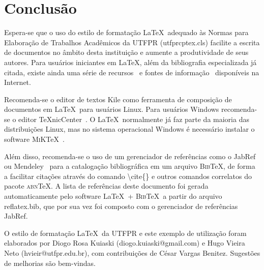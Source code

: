 \chapter{Conclus\~ao}

Espera-se que o uso do estilo de formata\c{c}\~ao \LaTeX\ adequado \`as Normas para Elabora\c{c}\~ao de Trabalhos Acad\^emicos da UTFPR ({\ttfamily utfprcptex.cls}) facilite a escrita de documentos no \^ambito desta institui\c{c}\~ao e aumente a produtividade de seus autores. Para usu\'arios iniciantes em \LaTeX, al\'em da bibliografia especializada j\'a citada, existe ainda uma s\'erie de recursos~\cite{CTAN2009} e fontes de informa\c{c}\~ao~\cite{TeX-Br2009,Wikibooks2009} dispon\'iveis na Internet.

Recomenda-se o editor de textos Kile como ferramenta de composi\c{c}\~ao de documentos em \LaTeX\ para usu\'arios Linux. Para usu\'arios Windows recomenda-se o editor \TeX nicCenter~\cite{TeXnicCenter2009}. O \LaTeX\ normalmente j\'a faz parte da maioria das distribui\c{c}\~oes Linux, mas no sistema operacional Windows \'e necess\'ario instalar o software \textsc{MiK}\TeX~\cite{MiKTeX2009}.

Al\'em disso, recomenda-se o uso de um gerenciador de refer\^encias como o JabRef~\cite{JabRef2009} ou Mendeley~\cite{Mendeley2009} para a cataloga\c{c}\~ao bibliogr\'afica em um arquivo \textsc{Bib}\TeX, de forma a facilitar cita\c{c}\~oes atrav\'es do comando {\ttfamily \textbackslash cite\{\}} e outros comandos correlatos do pacote \textsc{abn}\TeX. A lista de refer\^encias deste documento foi gerada automaticamente pelo software \LaTeX\ + \textsc{Bib}\TeX\ a partir do arquivo {\ttfamily reflatex.bib}, que por sua vez foi composto com o gerenciador de refer\^encias JabRef.

O estilo de formata\c{c}\~ao \LaTeX\ da UTFPR e este exemplo de utiliza\c{c}\~ao foram elaborados por Diogo Rosa Kuiaski (diogo.kuiaski@gmail.com) e Hugo Vieira Neto (hvieir@utfpr.edu.br), com contribui\c{c}\~oes de C\'esar Vargas Benitez. Sugest\~oes de melhorias s\~ao bem-vindas.
